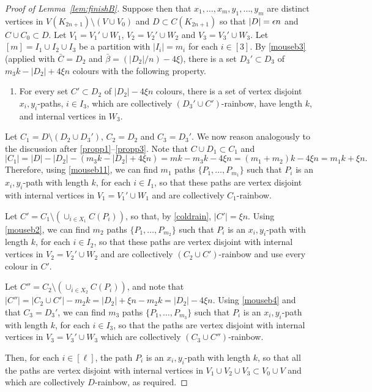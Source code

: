 \begin{proof}[Proof of Lemma~\ref{lem:finishB}]
Suppose then that $x_1,\ldots,x_m,y_1,\ldots,y_m$ are distinct vertices in $V(K_{2n+1})\setminus (V\cup V_0)$ and $D\subset C(K_{2n+1})$ so that $|D|=\epsilon n$ and $C\cup C_0\subset D$. Let $V_1=V_1'\cup W_1$, $V_2=V_2'\cup W_2$ and $V_3=V_3'\cup W_3$.
Let $[m]=I_1\cup I_2\cup I_3$ be a partition with $|I_i|=m_i$ for each $i\in [3]$.
By \ref{mouseb3} (applied with $\bar C=D_2$ and $\bar{\beta}=(|D_2|/n)-4\xi$), there is a set $D_3'\subset D_3$ of $m_3k-|D_2|+4\xi n$ colours with the following property.
\begin{enumerate}[label = {\bfseries \Alph{propcounter}\arabic{enumi}}]\addtocounter{enumi}{3}
\item For every set $C'\subset D_2$ of $|D_2|-4\xi n$ colours, there is a set of vertex disjoint $x_i,y_i$-paths, $i\in I_3$, which are collectively $(D_3'\cup C')$-rainbow, have length $k$, and internal vertices in $W_3$.\label{mouseb4}
\end{enumerate}

Let $C_1=D\setminus (D_2\cup D_3')$, $C_2=D_2$ and $C_3=D_3'$. We now reason analogously to the discussion after \ref{propp1}--\ref{propp3}.
Note that $C\cup D_1\subset C_1$ and 
\begin{equation}
    |C_1|=|D|-|D_2|-(m_3k-|D_2|+4\xi n)=mk-m_3k-4\xi n=(m_1+m_2)k-4\xi n=m_1k+\xi n.
\label{coldrain}
\end{equation}
Therefore, using \ref{mouseb11}, we can find $m_1$ paths $\{P_1, \dots, P_{m_1}\}$ such that $P_i$ is an $x_i,y_i$-path with length $k$, for each $i\in I_1$, so that these paths are vertex disjoint with internal vertices in $V_1=V_1'\cup W_1$ and are collectively $C_1$-rainbow. 

Let $C'=C_1\setminus (\cup_{i\in X_1}C(P_i))$, so that, by \eqref{coldrain}, $|C'|=\xi n$.
Using \ref{mouseb2},  we can find $m_2$ paths $\{P_1, \dots, P_{m_2}\}$ such that $P_i$ is an $x_i,y_i$-path with length $k$, for each $i\in I_2$, so that these paths are vertex disjoint with internal vertices in $V_2=V_2'\cup W_2$ and are collectively $(C_2\cup C')$-rainbow and use every colour in $C'$. 

Let $C''=C_2\setminus (\cup_{i\in X_2}C(P_i))$, and note that $|C''|=|C_2\cup C'|-m_2k=|D_2|+\xi n-m_2k=|D_2|-4\xi n$.
Using \ref{mouseb4} and that $C_3=D_3'$, we can find $m_3$ paths $\{P_1, \dots, P_{m_3}\}$ such that $P_i$ is an $x_i,y_i$-path with length $k$, for each $i\in I_3$, so that the paths are vertex disjoint with internal vertices in $V_3=V_3'\cup W_3$ which are collectively $(C_3\cup C'')$-rainbow.

Then, for each $i\in [\ell]$, the path $P_i$ is an $x_i,y_i$-path with length $k$, so that all the paths are vertex disjoint with internal vertices in $V_1\cup V_2\cup V_3\subset V_0\cup V$ and which are collectively $D$-rainbow, as required.
\end{proof}
